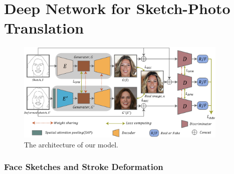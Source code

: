 
\section{Deep Network for Sketch-Photo Translation}
\label{sec:network}

\begin{figure}
	\includegraphics[width=0.9\textwidth]{figs/architecture}
	\caption{The architecture of our model.}
	\label{fig:architecture}
\end{figure}
%

%



\subsubsection{Face Sketches and Stroke Deformation}
\label{subsec:algorithm_data}



